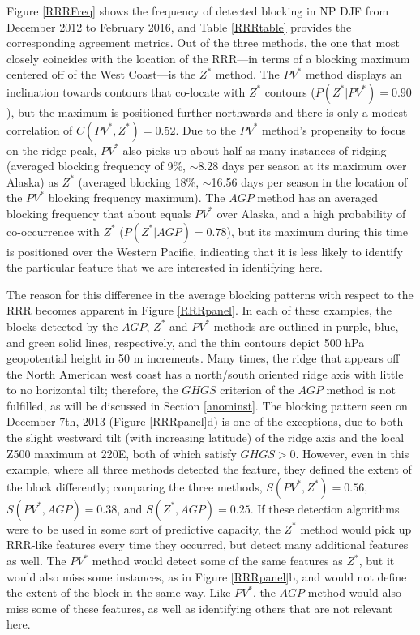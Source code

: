 \documentclass[smallextended]{svjour3}       %
\numberwithin{equation}{section}
\begin{document}
Figure \ref{RRRFreq} shows the frequency of detected blocking in NP DJF from December 2012 to February 2016, and Table \ref{RRRtable} provides the corresponding agreement metrics. Out of the three methods, the one that most closely coincides with the location of the RRR---in terms of a blocking maximum centered off of the West Coast---is the $Z^*$ method. The $PV^*$ method displays an inclination towards contours that co-locate with $Z^*$ contours ($P(Z^*|PV^*)=0.90$), but the maximum is positioned further northwards and there is only a modest correlation of $C(PV^*, Z^*)=0.52$. Due to the $PV^*$ method's propensity to focus on the ridge peak, $PV^*$ also picks up about half as many instances of ridging (averaged blocking frequency of 9\%, $\sim$8.28 days per season at its maximum over Alaska) as $Z^*$ (averaged blocking 18\%, $\sim$16.56 days per season in the location of the $PV^*$ blocking frequency maximum). The $AGP$ method has an averaged blocking frequency that about equals $PV^*$ over Alaska, and a high probability of co-occurrence with $Z^*$ ($P(Z^*|AGP)=0.78$), but its maximum during this time is positioned over the Western Pacific, indicating that it is less likely to identify the particular feature that we are interested in identifying here. 

The reason for this difference in the average blocking patterns with respect to the RRR becomes apparent in Figure \ref{RRRpanel}. In each of these examples, the blocks detected by the $AGP$, $Z^*$ and $PV^*$ methods are outlined in purple, blue, and green solid lines, respectively, and the thin contours depict 500 hPa geopotential height in 50 m increments. Many times, the ridge that appears off the North American west coast has a north/south oriented ridge axis with little to no horizontal tilt; therefore, the $GHGS$ criterion of the $AGP$ method is not fulfilled, as will be discussed in Section \ref{anominst}. The blocking pattern seen on December 7th, 2013 (Figure \ref{RRRpanel}d) is one of the exceptions, due to both the slight westward tilt (with increasing latitude) of  the ridge axis and the local Z500 maximum at 220E, both of which satisfy $GHGS>0$. However, even in this example, where all three methods detected the feature, they defined the extent of the block differently; comparing the three methods, $S(PV^*,Z^*)=0.56$, $S(PV^*,AGP)=0.38$, and $S(Z^*,AGP)=0.25$. If these detection algorithms were to be used in some sort of predictive capacity, the $Z^*$ method would pick up RRR-like features every time they occurred, but detect many additional features as well. The $PV^*$ method would detect some of the same features as $Z^*$, but it would also miss some instances, as in Figure \ref{RRRpanel}b, and would not define the extent of the block in the same way. Like $PV^*$, the $AGP$ method would also miss some of these features, as well as identifying others that are not relevant here. 
\end{document}

